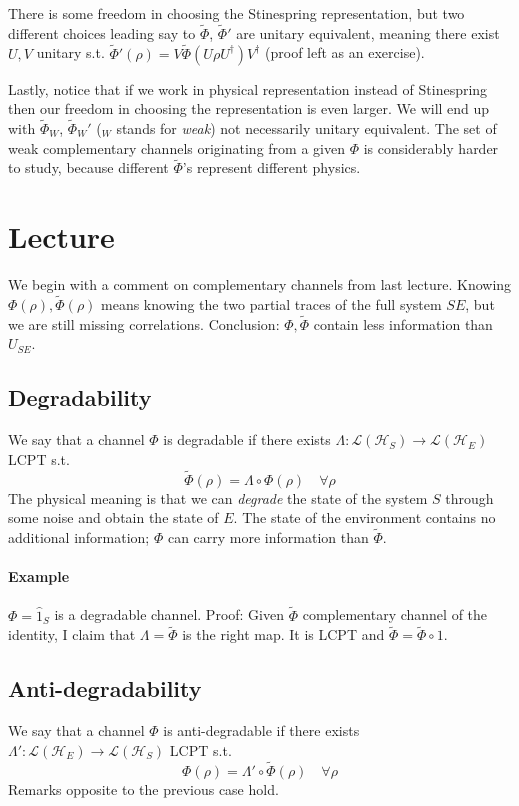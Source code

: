 \documentclass[a4paper, 11pt]{article}
\newcommand{\HH}{\mathcal{H}}
\begin{document}
	There is some freedom in choosing the Stinespring representation, but two different choices leading say to $\tilde{\Phi}$, $\tilde{\Phi}'$ are unitary equivalent, meaning there exist $U,V$ unitary s.t. $\tilde{\Phi}'(\rho) = V \tilde{\Phi}\left( U \rho U^\dagger \right) V^\dagger$ (proof left as an exercise).
	
	Lastly, notice that if we work in physical representation instead of Stinespring then our freedom in choosing the representation is even larger.
	We will end up with $\tilde{\Phi}_W$, $\tilde{\Phi}_W'$ ($_W$ stands for \emph{weak}) not necessarily unitary equivalent. The set of weak complementary channels originating from a given $\Phi$ is considerably harder to study, because different $\tilde{\Phi}$'s represent different physics.
	
	\section{Lecture}
	We begin with a comment on complementary channels from last lecture. Knowing $\Phi(\rho),\tilde{\Phi}(\rho)$ means knowing the two partial traces of the full system $SE$, but we are still missing correlations. Conclusion: $\Phi,\tilde{\Phi}$ contain less information than $U_{SE}$.
	
	\subsection{Degradability}
	We say that a channel $\Phi$ is degradable if there exists $\Lambda:\mathcal{L}(\HH_S)\rightarrow\mathcal{L}(\HH_E)$ LCPT s.t.
	\[ \tilde{\Phi}(\rho) = \Lambda \circ \Phi(\rho) \quad \forall \rho \]
	The physical meaning is that we can \emph{degrade} the state of the system $S$ through some noise and obtain the state of $E$. The state of the environment contains no additional information; $\Phi$ can carry more information than $\tilde{\Phi}$.
	
	\paragraph{Example} $\Phi = \hat{1}_S$ is a degradable channel. Proof: Given $\tilde{\Phi}$ complementary channel of the identity, I claim that $\Lambda = \tilde{\Phi}$ is the right map. It is LCPT and $\tilde{\Phi} = \tilde{\Phi} \circ 1$.
	
	\subsection{Anti-degradability}
	We say that a channel $\Phi$ is anti-degradable if there exists $\Lambda':\mathcal{L}(\HH_E)\rightarrow\mathcal{L}(\HH_S)$ LCPT s.t.
	\[ {\Phi}(\rho) = \Lambda' \circ \tilde{\Phi}(\rho) \quad \forall \rho \]
	Remarks opposite to the previous case hold.
	
\end{document}
